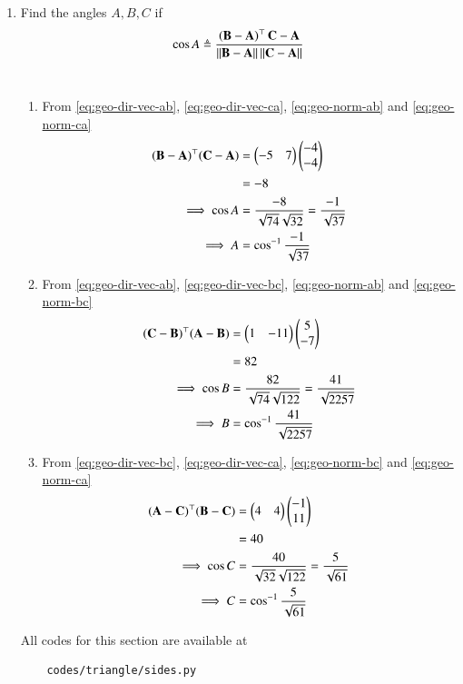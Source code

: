\begin{enumerate}[label=\thesubsection.\arabic*.,ref=\thesubsection.\theenumi]
%  		
	\item Find the angles $A, B, C$ if 
  \begin{align}
    \label{eq:angle2d}
			\cos A \triangleq 
\frac{\left(\mathbf{B}-\mathbf{A}\right)^{\top}{\mathbf{C}-\mathbf{A}}}{\left\lVert\mathbf{B}-\mathbf{A}\right\rVert\left\lVert\mathbf{C}-\mathbf{A}\right\rVert}
  \end{align}\\
  \solution
\begin{enumerate}
	\item From 
		\eqref{eq:geo-dir-vec-ab},
		\eqref{eq:geo-dir-vec-ca},
		\eqref{eq:geo-norm-ab}
		and
		\eqref{eq:geo-norm-ca}
\begin{align}
	(\mathbf{B}-\mathbf{A})^{\top}(\mathbf{C}-\mathbf{A})&=\begin{pmatrix}-5&7\end{pmatrix}\begin{pmatrix}-4\\-4\end{pmatrix}\\
	&=-8
	\\
	\implies
	\cos{A}&= \frac{-8}{\sqrt{74} \sqrt{32}}
	= \frac{-1}{\sqrt{37}}\\
	\implies A&=\cos^{-1}{\frac{-1}{\sqrt{37}}}
\end{align}
	\item From 
		\eqref{eq:geo-dir-vec-ab},
		\eqref{eq:geo-dir-vec-bc},
		\eqref{eq:geo-norm-ab}
		and
		\eqref{eq:geo-norm-bc}
\begin{align}
	(\mathbf{C}-\mathbf{B})^{\top}(\mathbf{A}-\mathbf{B})&=\begin{pmatrix}1&-11\end{pmatrix}\begin{pmatrix}5\\-7\end{pmatrix}\\
	&= 82
	\\
	\implies
	\cos{B}&= \frac{82}{\sqrt{74} \sqrt{122}}
	= \frac{41}{\sqrt{2257}}\\
	\implies B&=\cos^{-1}{\frac{41}{\sqrt{2257}}}
\end{align}
	\item From 
		\eqref{eq:geo-dir-vec-bc},
		\eqref{eq:geo-dir-vec-ca},
		\eqref{eq:geo-norm-bc}
		and
		\eqref{eq:geo-norm-ca}
\begin{align}
	(\mathbf{A}-\mathbf{C})^{\top}(\mathbf{B}-\mathbf{C})&=\begin{pmatrix}4&4\end{pmatrix}\begin{pmatrix}-1\\11\end{pmatrix}\\
	&=40
	\\
\implies	\cos{C}&= \frac{40}{\sqrt{32} \sqrt{122}}
	= \frac{5}{\sqrt{61}}\\
	\implies C&=\cos^{-1}{\frac{5}{\sqrt{61}}}
\end{align}

\end{enumerate}
%  	
All codes for this section are available at
\begin{lstlisting}
	codes/triangle/sides.py
\end{lstlisting}
\end{enumerate}
